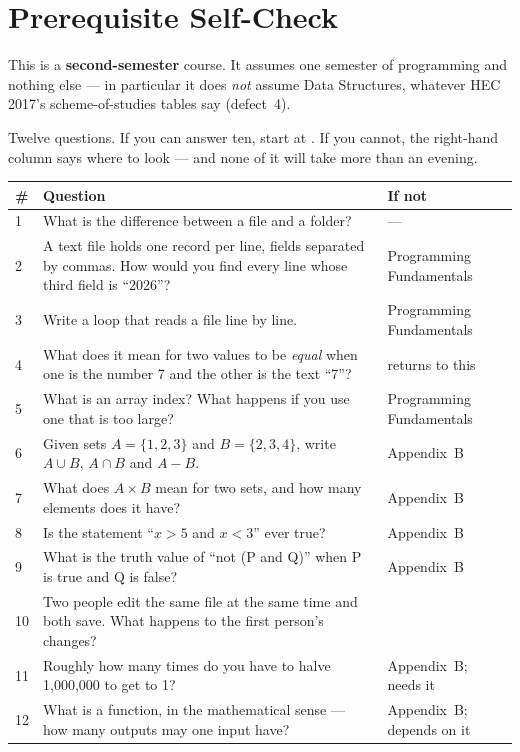 \newpage

\chapter*{Prerequisite Self-Check}

This is a \textbf{second-semester} course. It assumes one semester of
programming and nothing else --- in particular it does \emph{not} assume Data
Structures, whatever HEC 2017's scheme-of-studies tables say (defect~4).

Twelve questions. If you can answer ten, start at . If you
cannot, the right-hand column says where to look --- and none of it will take
more than an evening.

\begin{longtable}{@{}L{0.8cm}L{9.4cm}L{4.4cm}@{}}
\toprule
{}
\textbf{\#} & \textbf{Question} & \textbf{If not} \\
\midrule
{} & What is the difference between a file and a folder? & --- \\
2 & A text file holds one record per line, fields separated by commas. How
would you find every line whose third field is ``2026''? & Programming
Fundamentals \\
3 & Write a loop that reads a file line by line. & Programming Fundamentals \\
4 & What does it mean for two values to be \emph{equal} when one is the number
7 and the other is the text ``7''? &  returns to this \\
5 & What is an array index? What happens if you use one that is too large? &
Programming Fundamentals \\
6 & Given sets $A=\{1,2,3\}$ and $B=\{2,3,4\}$, write $A \cup B$, $A \cap B$
and $A - B$. & Appendix~B \\
7 & What does $A \times B$ mean for two sets, and how many elements does it
have? & Appendix~B \\
8 & Is the statement ``$x > 5$ and $x < 3$'' ever true? & Appendix~B \\
9 & What is the truth value of ``not (P and Q)'' when P is true and Q is
false? & Appendix~B \\
10 & Two people edit the same file at the same time and both save. What
happens to the first person's changes? &  \\
11 & Roughly how many times do you have to halve 1{,}000{,}000 to get to 1? &
Appendix~B;  needs it \\
12 & What is a function, in the mathematical sense --- how many outputs may one
input have? & Appendix~B;  depends on it \\
\bottomrule
\end{longtable}

